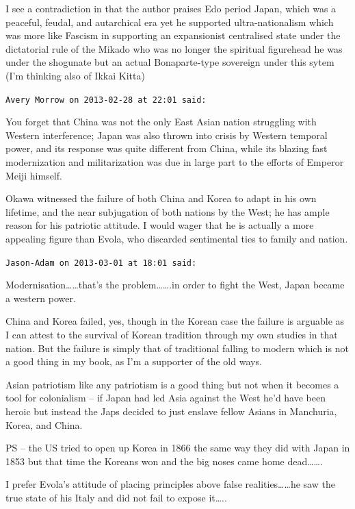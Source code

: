 \begin{footnotesize}
\begin{sffamily}
I see a contradiction in that the author praises Edo period Japan, which was a peaceful, feudal, and autarchical era yet he supported ultra-nationalism which was more like Fascism in supporting an expansionist centralised state under the dictatorial rule of the Mikado who was no longer the spiritual figurehead he was under the shogunate but an actual Bonaparte-type sovereign under this sytem (I'm thinking also of Ikkai Kitta)


\hfill

\texttt{Avery Morrow on 2013-02-28 at 22:01 said: }

You forget that China was not the only East Asian nation struggling with Western interference; Japan was also thrown into crisis by Western temporal power, and its response was quite different from China, while its blazing fast modernization and militarization was due in large part to the efforts of Emperor Meiji himself.

Okawa witnessed the failure of both China and Korea to adapt in his own lifetime, and the near subjugation of both nations by the West; he has ample reason for his patriotic attitude. I would wager that he is actually a more appealing figure than Evola, who discarded sentimental ties to family and nation.


\hfill

\texttt{Jason-Adam on 2013-03-01 at 18:01 said: }

Modernisation……that's the problem…….in order to fight the West, Japan became a western power. 

China and Korea failed, yes, though in the Korean case the failure is arguable as I can attest to the survival of Korean tradition through my own studies in that nation. But the failure is simply that of traditional falling to modern which is not a good thing in my book, as I'm a supporter of the old ways.

Asian patriotism like any patriotism is a good thing but not when it becomes a tool for colonialism – if Japan had led Asia against the West he'd have been heroic but instead the Japs decided to just enslave fellow Asians in Manchuria, Korea, and China.

PS – the US tried to open up Korea in 1866 the same way they did with Japan in 1853 but that time the Koreans won and the big noses came home dead…….

I prefer Evola's attitude of placing principles above false realities……he saw the true state of his Italy and did not fail to expose it…..



\end{sffamily}
\end{footnotesize}
